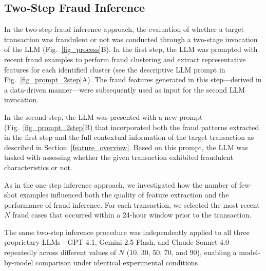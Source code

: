 \documentclass[sigconf]{acmart}
\begin{document}
\subsection{Two-Step Fraud Inference}\label{two_step_inference}

In the two-step fraud inference approach, the evaluation of whether a target transaction was fraudulent or not  was conducted through a two-stage invocation of the LLM (Fig.~\ref{fig_process}B).
In the first step, the LLM was prompted with recent fraud examples to perform fraud clustering and extract representative features for each identified cluster (see the descriptive LLM prompt in Fig.~\ref{fig_prompt_2step}A). The fraud features generated in this step—derived in a data-driven manner—were subsequently used as input for the second LLM invocation.

In the second step, the LLM was presented with a new prompt (Fig.~\ref{fig_prompt_2step}B) that incorporated both the fraud patterns extracted in the first step and the full contextual information of the target transaction as described in Section~\ref{feature_overview}. Based on this prompt, the LLM was tasked with assessing whether the given transaction exhibited fraudulent characteristics or not.

As in the one-step inference approach, we investigated how the number of few-shot examples influenced both the quality of feature extraction and the performance of fraud inference. For each transaction, we selected the most recent $N$ fraud cases that occurred within a 24-hour window prior to the transaction. 

The same two-step inference procedure was independently applied to all three proprietary LLMs—GPT 4.1, Gemini 2.5 Flash, and Claude Sonnet 4.0—repeatedly across different values of $N$ (10, 30, 50, 70, and 90), enabling a model-by-model comparison under identical experimental conditions.
\end{document}
